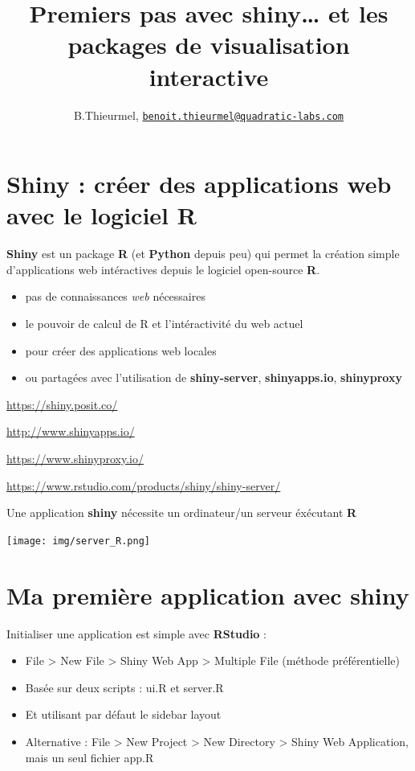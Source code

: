 \documentclass[
]{article}
\title{Premiers pas avec shiny\ldots{} et les packages de visualisation
interactive}
\author{B.Thieurmel,
\href{mailto:benoit.thieurmel@quadratic-labs.com}{\nolinkurl{benoit.thieurmel@quadratic-labs.com}}}
\date{}
\providecommand{\tightlist}{%
  \setlength{\itemsep}{0pt}\setlength{\parskip}{0pt}}
\begin{document}
\maketitle

{
\setcounter{tocdepth}{2}
\tableofcontents
}
\hypertarget{shiny-cruxe9er-des-applications-web-avec-le-logiciel-r}{%
\section{Shiny : créer des applications web avec le logiciel
R}\label{shiny-cruxe9er-des-applications-web-avec-le-logiciel-r}}

\textbf{Shiny} est un package \textbf{R} (et \textbf{Python} depuis peu)
qui permet la création simple d'applications web intéractives depuis le
logiciel open-source \textbf{R}.

\begin{itemize}
\tightlist
\item
  pas de connaissances \emph{web} nécessaires
\item
  le pouvoir de calcul de R et l'intéractivité du web actuel
\item
  pour créer des applications web locales
\item
  ou partagées avec l'utilisation de \textbf{shiny-server},
  \textbf{shinyapps.io}, \textbf{shinyproxy}
\end{itemize}

\url{https://shiny.posit.co/}

\url{http://www.shinyapps.io/}

\url{https://www.shinyproxy.io/}

\url{https://www.rstudio.com/products/shiny/shiny-server/}

Une application \textbf{shiny} nécessite un ordinateur/un serveur
éxécutant \textbf{R}

\texttt{[image: img/server\_R.png]}

\hypertarget{ma-premiuxe8re-application-avec-shiny}{%
\section{Ma première application avec
shiny}\label{ma-premiuxe8re-application-avec-shiny}}

Initialiser une application est simple avec \textbf{RStudio} :

\begin{itemize}
\tightlist
\item
  File \textgreater{} New File \textgreater{} Shiny Web App
  \textgreater{} Multiple File (méthode préférentielle)
\item
  Basée sur deux scripts : ui.R et server.R
\item
  Et utilisant par défaut le sidebar layout
\item
  Alternative : File \textgreater{} New Project \textgreater{} New
  Directory \textgreater{} Shiny Web Application, mais un seul fichier
  app.R
\end{itemize}
\end{document}
